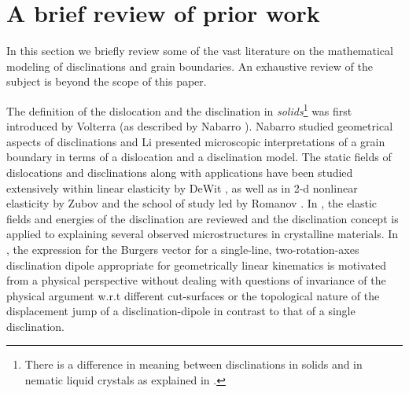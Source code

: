 \documentclass[11pt,letterpaper]{article}
\begin{document}
\section{A brief review of prior work} \label{sec:disclination_intro}
In this section we briefly review some of the vast literature on the mathematical modeling of disclinations and grain boundaries. An exhaustive review of the subject is beyond the scope of this paper.

The definition of the dislocation and the disclination in \emph{solids}\footnote{
There is a difference in meaning between disclinations in solids and in nematic liquid crystals as explained in \cite{romanov2009application, kleman2008disclinations, pourmatin2012fundamental}.
} 
was first introduced by Volterra (as described by Nabarro \cite{Nabarro1987}). Nabarro \cite{Nabarro1987} studied geometrical aspects of disclinations and Li \cite{li1972disclination} presented microscopic interpretations of a grain boundary in terms of a dislocation and a disclination model. The static fields of dislocations and disclinations along with applications have been studied extensively within linear elasticity by DeWit \cite{wit1970linear, dewit1971relation, de1973theory, de1972partial}, as well as in 2-d nonlinear elasticity by Zubov \cite{zubov1997nonlinear} and the school of study led by Romanov \cite{romanov2009application}. In \cite{romanov2009application}, the elastic fields and energies of the disclination are reviewed and the disclination concept is applied to explaining several observed microstructures in crystalline materials. In \cite{romanov1992disclination}, the expression for the Burgers vector for a single-line, two-rotation-axes disclination dipole appropriate for geometrically linear kinematics is motivated from a physical perspective without dealing with questions of invariance of the physical argument w.r.t different cut-surfaces or the topological nature of the displacement jump of a disclination-dipole in contrast to that of a single disclination.
\end{document}
